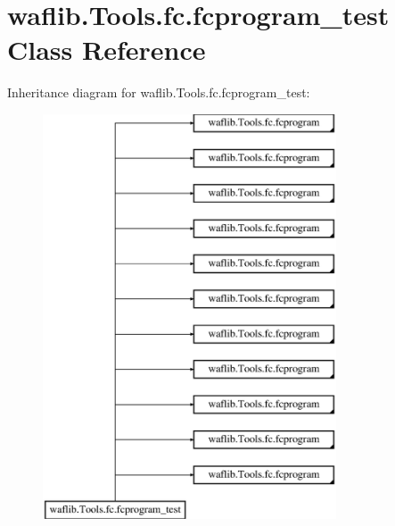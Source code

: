 \hypertarget{classwaflib_1_1_tools_1_1fc_1_1fcprogram__test}{}\section{waflib.\+Tools.\+fc.\+fcprogram\+\_\+test Class Reference}
\label{classwaflib_1_1_tools_1_1fc_1_1fcprogram__test}
Inheritance diagram for waflib.\+Tools.\+fc.\+fcprogram\+\_\+test\+:\begin{figure}[H]
\begin{center}
\leavevmode
\includegraphics[height=12.000000cm]{classwaflib_1_1_tools_1_1fc_1_1fcprogram__test}
\end{center}
\end{figure}
